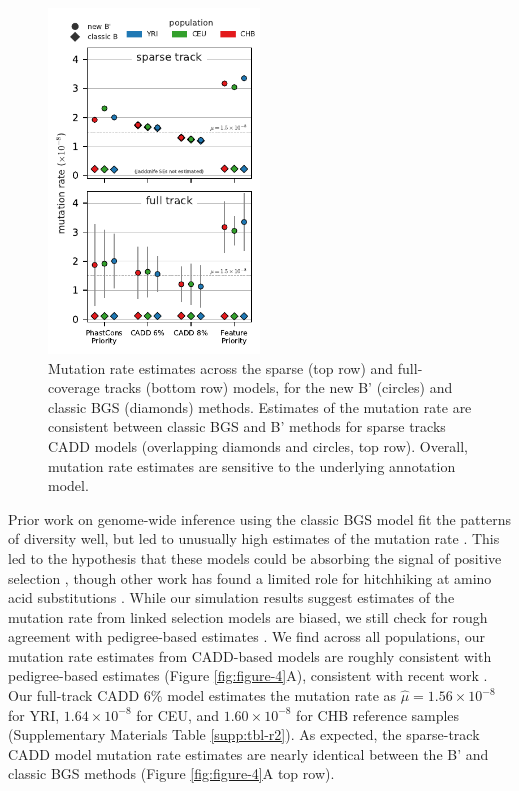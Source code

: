 \documentclass[11pt]{article}
\begin{document}
\begin{figure}[htbp] 
    \centering
    \includegraphics[width=0.5\textwidth]{figures/figure_5.pdf} 
    
    \caption{Mutation rate estimates across the sparse (top row) and
        full-coverage tracks (bottom row) models, for the new B' (circles) and
        classic BGS (diamonds) methods. Estimates of the mutation rate are
        consistent between classic BGS and B' methods for sparse tracks CADD
        models (overlapping diamonds and circles, top row). Overall, mutation
        rate estimates are sensitive to the underlying annotation model.}
  \label{fig:figure-5}
\end{figure}

Prior work on genome-wide inference using the classic BGS model fit the patterns of diversity well,
but led to unusually high estimates of the mutation rate
\parencite{McVicker2009-ax}. This led to the hypothesis that these models
could be absorbing the signal of positive selection \parencite{Enard2014-kz},
though other work has found a limited role for hitchhiking at amino acid substitutions \parencite{Pickrell2009-tt,Hernandez2011-gs,Murphy2022-sj}. While our simulation
results suggest estimates of the mutation rate from linked selection models are
biased, we still check for rough agreement with pedigree-based estimates
\parencite{Kong2013-fc,Tian2019-so}. 
We find across all populations, our mutation rate estimates from CADD-based
models are roughly consistent with pedigree-based estimates (Figure
\ref{fig:figure-4}A), consistent with recent work \parencite{Murphy2022-sj}.
Our full-track CADD 6\% model estimates the mutation rate as $\widehat{\mu} =
1.56 \times 10^{-8}$ for YRI, $1.64 \times 10^{-8}$ for CEU, and $1.60 \times
10^{-8}$ for CHB reference samples (Supplementary Materials Table
\ref{supp:tbl-r2}). As expected, the sparse-track CADD model mutation rate
estimates are nearly identical between the B' and classic BGS methods (Figure
\ref{fig:figure-4}A top row).
\end{document}
